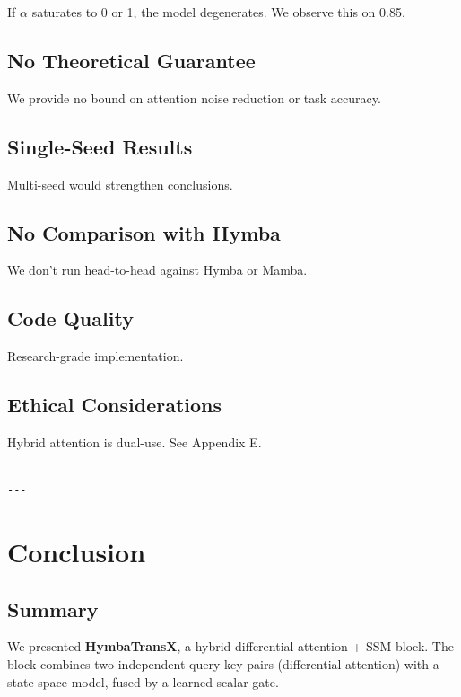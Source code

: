 If $\alpha$ saturates to 0 or 1, the model degenerates. We observe this on 
0.85.

\subsection{No Theoretical Guarantee}

We provide no bound on attention noise reduction or task accuracy.

\subsection{Single-Seed Results}

Multi-seed would strengthen conclusions.

\subsection{No Comparison with Hymba}

We don't run head-to-head against Hymba or Mamba.

\subsection{Code Quality}

Research-grade implementation.

\subsection{Ethical Considerations}

Hybrid attention is dual-use. See Appendix E.
\begin{lstlisting}

---
\end{lstlisting}

\section{Conclusion}

\subsection{Summary}

We presented \textbf{HymbaTransX}, a hybrid differential attention + SSM block. 
The block combines two independent query-key pairs (differential attention) 
with a state space model, fused by a learned scalar gate.

